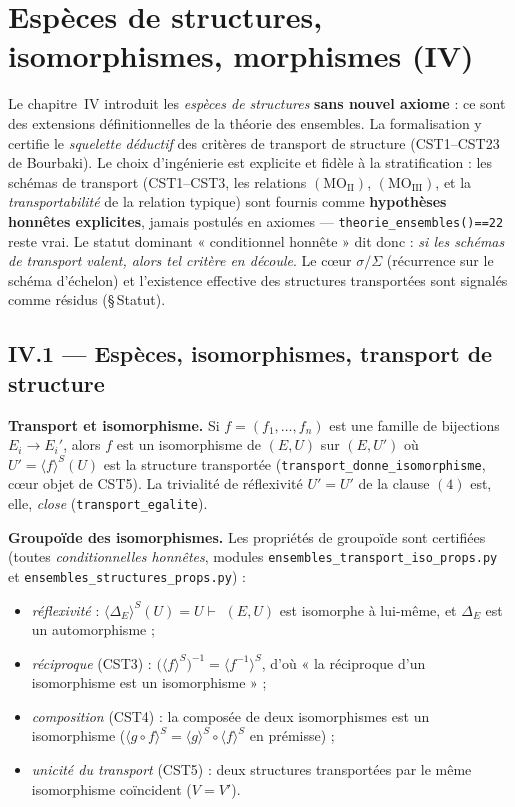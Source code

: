 \section{Espèces de structures, isomorphismes, morphismes (IV)}

Le chapitre~IV introduit les \emph{espèces de structures} \textbf{sans nouvel
axiome} : ce sont des extensions définitionnelles de la théorie des ensembles.
La formalisation y certifie le \emph{squelette déductif} des critères de
transport de structure (CST1--CST23 de Bourbaki). Le choix d'ingénierie est
explicite et fidèle à la stratification : les schémas de transport (CST1--CST3,
les relations $(\mathrm{MO}_{\mathrm{II}})$, $(\mathrm{MO}_{\mathrm{III}})$, et
la \emph{transportabilité} de la relation typique) sont fournis comme
\textbf{hypothèses honnêtes explicites}, jamais postulés en axiomes
--- \texttt{theorie\_ensembles()==22} reste vrai. Le statut dominant
« conditionnel honnête » dit donc : \emph{si les schémas de transport valent,
alors tel critère en découle}. Le c\oe ur $\sigma/\Sigma$ (récurrence sur le
schéma d'échelon) et l'existence effective des structures transportées sont
signalés comme résidus (\S\,Statut).

\subsection{IV.1 --- Espèces, isomorphismes, transport de structure}

\textbf{Transport et isomorphisme.} Si $f=(f_1,\dots,f_n)$ est une famille de
bijections $E_i\!\to\!E_i'$, alors $f$ est un isomorphisme de $(E,U)$ sur
$(E,U')$ où $U'=\langle f\rangle^{S}(U)$ est la structure transportée
(\texttt{transport\_donne\_isomorphisme}, c\oe ur objet de CST5). La trivialité
de réflexivité $U'=U'$ de la clause $(4)$ est, elle, \emph{close}
(\texttt{transport\_egalite}).

\textbf{Groupoïde des isomorphismes.} Les propriétés de groupoïde sont
certifiées (toutes \emph{conditionnelles honnêtes}, modules
\texttt{ensembles\_transport\_iso\_props.py} et \texttt{ensembles\_structures\_props.py}) :
\begin{itemize}
  \item \emph{réflexivité} : $\langle\Delta_E\rangle^{S}(U)=U \vdash$
        $(E,U)$ est isomorphe à lui-même, et $\Delta_E$ est un automorphisme ;
  \item \emph{réciproque} (CST3) : $\bigl(\langle f\rangle^{S}\bigr)^{-1}=
        \langle f^{-1}\rangle^{S}$, d'où « la réciproque d'un isomorphisme est un
        isomorphisme » ;
  \item \emph{composition} (CST4) : la composée de deux isomorphismes est un
        isomorphisme ($\langle g\circ f\rangle^{S}=\langle g\rangle^{S}\circ
        \langle f\rangle^{S}$ en prémisse) ;
  \item \emph{unicité du transport} (CST5) : deux structures transportées par le
        même isomorphisme coïncident ($V=V'$).
\end{itemize}

